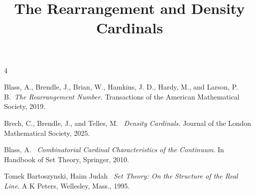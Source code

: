 \documentclass[11pt,oneside]{report}
\title{\Huge \textbf{The Rearrangement and Density Cardinals}}
\date{}
\begin{document}
\maketitle



\tableofcontents











\begin{thebibliography}{4}

 Blass, A., Brendle, J., Brian, W., Hamkins, J. D., Hardy, M., and Larson, P. B.\ {\em The Rearrangement Number.} Transactions of the American Mathematical Society, 2019.

 Brech, C., Brendle, J., and Telles, M. \ {\em Density Cardinals.} Journal of the London Mathematical Society, 2025.

 Blass, A. \ {\em Combinatorial Cardinal Characteristics of the Continuum}. In Handbook of Set Theory, Springer, 2010.

 Tomek Bartoszynski, Haim Judah \ {\em Set Theory: On the Structure of the Real Line}. A K Peters, Wellesley, Mass., 1995.

\end{thebibliography}
\end{document}
